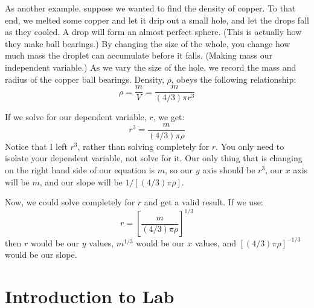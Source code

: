 \documentclass{book}
\begin{document}
As another example, suppose we wanted to find the density of copper.  To that end, we melted some copper and let it drip out a small hole, and let the drops fall as they cooled.  A drop will form an almost perfect sphere. (This is actually how they make ball bearings.)  By changing the size of the whole, you change how much mass the droplet can accumulate before it falls.  (Making mass our independent variable.)  As we vary the size of the hole, we record the mass and radius of the copper ball bearings.  Density, $\rho$, obeys the following relationship:
\[\rho = \frac{m}{V}=\frac{m}{(4/3)\pi r^3}\]

If we solve for our dependent variable, $r$, we get:
\[r^3=\frac{m}{(4/3)\pi\rho}\]
Notice that I left $r^3$, rather than solving completely for $r$.  You only need to isolate your dependent variable, not solve for it.  Our only thing that is changing on the right hand side of our equation is $m$, so our $y$ axis should be $r^3$, our $x$ axis will be $m$, and our slope will be $1/\left[\left(4/3\right)\pi\rho\right]$.

Now, we could solve completely for $r$ and get a valid result.  If we use:
\[r=\left[\frac{m}{(4/3)\pi\rho}\right]^{1/3}\]
then $r$ would be our $y$ values, $m^{1/3}$ would be our $x$ values, and $\left[\left(4/3\right)\pi\rho\right]^{-1/3}$ would be our slope.


\section{Introduction to Lab}
\end{document}
